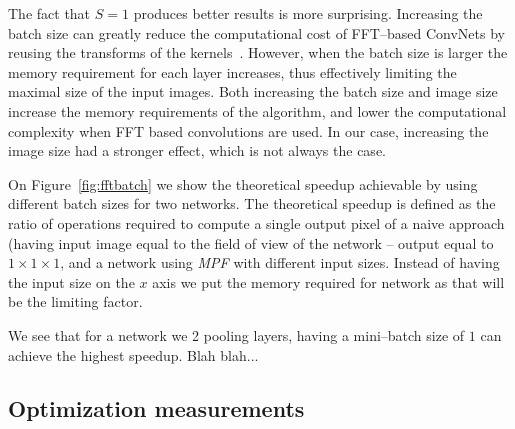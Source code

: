 \documentclass[conference]{./IEEEtran/IEEEtran}
\begin{document}
  The fact that $S=1$ produces better results is more surprising.
  Increasing the batch size can greatly reduce the computational cost
  of FFT--based ConvNets by reusing the transforms of the
  kernels~\cite{mathieu-iclr-14,vasilache2014fast}.  However, when the
  batch size is larger the memory requirement for each layer
  increases, thus effectively limiting the maximal size of the input
  images.  Both increasing the batch size and image size increase the
  memory requirements of the algorithm, and lower the computational
  complexity when FFT based convolutions are used.  In our case,
  increasing the image size had a stronger effect, which is not always
  the case.

  On Figure~\ref{fig:fftbatch} we show the theoretical speedup
  achievable by using different batch sizes for two networks.  The
  theoretical speedup is defined as the ratio of operations required
  to compute a single output pixel of a naive approach (having input
  image equal to the field of view of the network -- output equal to
  $1 \times 1 \times 1$, and a network using \emph{MPF} with different
  input sizes.  Instead of having the input size on the $x$ axis we
  put the memory required for network as that will be the limiting
  factor.

  We see that for a network we 2 pooling layers, having a mini--batch
  size of $1$ can achieve the highest speedup.  Blah blah...


\subsection{Optimization measurements}


\end{document}
